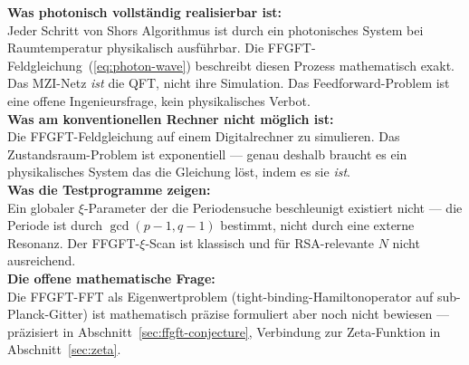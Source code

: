 \begin{conclusionBox}
\textbf{Was photonisch vollständig realisierbar ist:}\\
Jeder Schritt von Shors Algorithmus ist durch ein
photonisches System bei Raumtemperatur physikalisch
ausführbar. Die FFGFT-Feldgleichung~(\ref{eq:photon-wave})
beschreibt diesen Prozess mathematisch exakt.
Das MZI-Netz \emph{ist} die QFT, nicht ihre Simulation.
Das Feedforward-Problem ist eine offene Ingenieursfrage,
kein physikalisches Verbot.\\[6pt]

\textbf{Was am konventionellen Rechner nicht möglich ist:}\\
Die FFGFT-Feldgleichung auf einem Digitalrechner zu simulieren.
Das Zustandsraum-Problem ist exponentiell --- genau deshalb
braucht es ein physikalisches System das die Gleichung löst,
indem es sie \emph{ist}.\\[6pt]

\textbf{Was die Testprogramme zeigen:}\\
Ein globaler $\xi$-Parameter der die Periodensuche
beschleunigt existiert nicht --- die Periode ist
durch $\gcd(p-1, q-1)$ bestimmt, nicht durch
eine externe Resonanz. Der FFGFT-$\xi$-Scan ist
klassisch und für RSA-relevante $N$ nicht ausreichend.\\[6pt]

\textbf{Die offene mathematische Frage:}\\
Die FFGFT-FFT als Eigenwertproblem (tight-binding-Hamiltonoperator
auf sub-Planck-Gitter) ist mathematisch präzise formuliert
aber noch nicht bewiesen --- präzisiert in
Abschnitt~\ref{sec:ffgft-conjecture},
Verbindung zur Zeta-Funktion in Abschnitt~\ref{sec:zeta}.
\end{conclusionBox}



